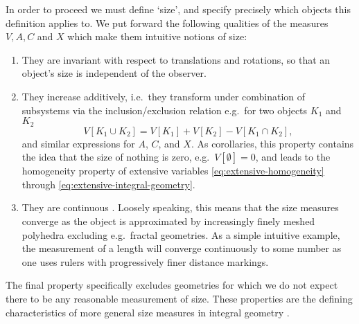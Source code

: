 In order to proceed we must define `size', and specify precisely which objects this definition applies to.
We put forward the following qualities of the measures $V, A, C$ and $X$ which make them intuitive notions of size:
\begin{enumerate}
\item They are invariant with respect to translations and rotations, so that an object's size is independent of the observer.
\item They increase additively, i.e.\ they transform under combination of subsystems via the inclusion/exclusion relation e.g.\ for two objects $K_1$ and $K_2$%
  \begin{equation}\label{eq:additivity}
    V[K_1 \cup K_2] = V[K_1] + V[K_2] - V[K_1 \cap K_2],
  \end{equation}
  and similar expressions for $A$, $C$, and $X$.
  As corollaries, this property contains the idea that the size of nothing is zero, e.g.\ $V[\emptyset] = 0$, and leads to the homogeneity property of extensive variables \eqref{eq:extensive-homogeneity} through \eqref{eq:extensive-integral-geometry}.
\item They are continuous%
  .
  Loosely speaking, this means that the size measures converge as the object is approximated by increasingly finely meshed polyhedra excluding e.g.\ fractal geometries.
  As a simple intuitive example, the measurement of a length will converge continuously to some number as one uses rulers with progressively finer distance markings.
\end{enumerate}
The final property specifically excludes geometries for which we do not expect there to be any reasonable measurement of size.
These properties are the defining characteristics of more general size measures in integral geometry \cite{Santalo2004, Klain1997}.



